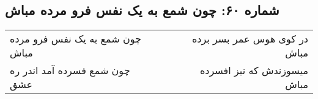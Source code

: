 \begin{center}
\section*{شماره ۶۰: چون شمع به یک نفس فرو مرده مباش}
\label{sec:060}
\begin{longtable}{l p{0.5cm} r}
چون شمع به یک نفس فرو مرده مباش
&&
در کوی هوس عمر بسر برده مباش
\\
چون شمع فسرده آمد اندر ره عشق
&&
میسوزندش که نیز افسرده مباش
\\
\end{longtable}
\end{center}
